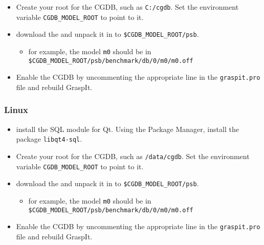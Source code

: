 \begin{itemize}
\begin{itemize}
\end{itemize}
\item Create your root for the CGDB, such as \texttt{C:/cgdb}. Set the
  environment variable \texttt{CGDB\_MODEL\_ROOT} to point to it.
\item download the 
  and unpack it in to \texttt{\$CGDB\_MODEL\_ROOT/psb}.
\begin{itemize}
\item for example, the model \texttt{m0} should be in
  \texttt{\$CGDB\_MODEL\_ROOT/psb/benchmark/db/0/m0/m0.off}
\end{itemize}
\item Enable the CGDB by uncommenting the appropriate line in the
  \texttt{graspit.pro} file and rebuild GraspIt.
\end{itemize}

\subsubsection{Linux}
\begin{itemize}
\item install the SQL module for Qt. Using the Package Manager,
  install the package \texttt{libqt4-sql}.
\item Create your root for the CGDB, such as \texttt{/data/cgdb}. Set
  the environment variable \texttt{CGDB\_MODEL\_ROOT} to point to it.
\item download the 
  and unpack it in to \texttt{\$CGDB\_MODEL\_ROOT/psb}.
\begin{itemize}
\item for example, the model \texttt{m0} should be in
  \texttt{\$CGDB\_MODEL\_ROOT/psb/benchmark/db/0/m0/m0.off}
\end{itemize}
\item Enable the CGDB by uncommenting the appropriate line in the
  \texttt{graspit.pro} file and rebuild GraspIt.
\end{itemize}


